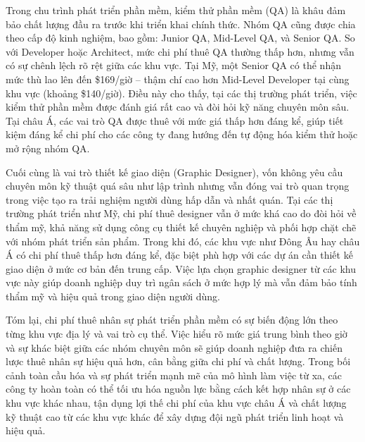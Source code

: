     
      Trong chu trình phát triển phần mềm, kiểm thử phần mềm (QA) là khâu đảm bảo chất lượng đầu ra trước khi triển khai chính thức. Nhóm QA cũng được chia theo cấp độ kinh nghiệm, bao gồm: Junior QA, Mid-Level QA, và Senior QA. So với Developer hoặc Architect, mức chi phí thuê QA thường thấp hơn, nhưng vẫn có sự chênh lệch rõ rệt giữa các khu vực. Tại Mỹ, một Senior QA có thể nhận mức thù lao lên đến \$169/giờ – thậm chí cao hơn Mid-Level Developer tại cùng khu vực (khoảng \$140/giờ). Điều này cho thấy, tại các thị trường phát triển, việc kiểm thử phần mềm được đánh giá rất cao và đòi hỏi kỹ năng chuyên môn sâu. Tại châu Á, các vai trò QA được thuê với mức giá thấp hơn đáng kể, giúp tiết kiệm đáng kể chi phí cho các công ty đang hướng đến tự động hóa kiểm thử hoặc mở rộng nhóm QA.
    \vspace{0.5em}

    
      Cuối cùng là vai trò thiết kế giao diện (Graphic Designer), vốn không yêu cầu chuyên môn kỹ thuật quá sâu như lập trình nhưng vẫn đóng vai trò quan trọng trong việc tạo ra trải nghiệm người dùng hấp dẫn và nhất quán. Tại các thị trường phát triển như Mỹ, chi phí thuê designer vẫn ở mức khá cao do đòi hỏi về thẩm mỹ, khả năng sử dụng công cụ thiết kế chuyên nghiệp và phối hợp chặt chẽ với nhóm phát triển sản phẩm. Trong khi đó, các khu vực như Đông Âu hay châu Á có chi phí thuê thấp hơn đáng kể, đặc biệt phù hợp với các dự án cần thiết kế giao diện ở mức cơ bản đến trung cấp. Việc lựa chọn graphic designer từ các khu vực này giúp doanh nghiệp duy trì ngân sách ở mức hợp lý mà vẫn đảm bảo tính thẩm mỹ và hiệu quả trong giao diện người dùng.
    \vspace{0.5em}

    
      Tóm lại, chi phí thuê nhân sự phát triển phần mềm có sự biến động lớn theo từng khu vực địa lý và vai trò cụ thể. Việc hiểu rõ mức giá trung bình theo giờ và sự khác biệt giữa các nhóm chuyên môn sẽ giúp doanh nghiệp đưa ra chiến lược thuê nhân sự hiệu quả hơn, cân bằng giữa chi phí và chất lượng. Trong bối cảnh toàn cầu hóa và sự phát triển mạnh mẽ của mô hình làm việc từ xa, các công ty hoàn toàn có thể tối ưu hóa nguồn lực bằng cách kết hợp nhân sự ở các khu vực khác nhau, tận dụng lợi thế chi phí của khu vực châu Á và chất lượng kỹ thuật cao từ các khu vực khác để xây dựng đội ngũ phát triển linh hoạt và hiệu quả.
